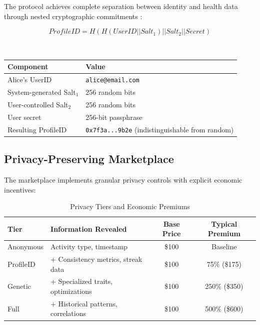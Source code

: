 \documentclass[11pt,letterpaper]{article}
\begin{document}
The protocol achieves complete separation between identity and health data through nested cryptographic commitments \cite{harshberger2025patent,groth2016size}:

\begin{equation}
ProfileID = H(H(UserID || Salt_1) || Salt_2 || Secret)
\end{equation}


~


\begin{table}[H]
\centering
\begin{tabular}{ll}
\toprule
\textbf{Component} & \textbf{Value} \\
\midrule
Alice's UserID & \texttt{alice@email.com} \\
System-generated Salt$_1$ & 256 random bits \\
User-controlled Salt$_2$ & 256 random bits \\
User secret & 256-bit passphrase \\
Resulting ProfileID & \texttt{0x7f3a...9b2e} (indistinguishable from random) \\
\bottomrule
\end{tabular}
\end{table}


\subsection{Privacy-Preserving Marketplace}

The marketplace implements granular privacy controls with explicit economic incentives:

\begin{table}[H]
\centering
\caption{Privacy Tiers and Economic Premiums}
\begin{tabular}{llcc}
\toprule
\textbf{Tier} & \textbf{Information Revealed} & \textbf{Base Price} & \textbf{Typical Premium} \\
\midrule
Anonymous & Activity type, timestamp & \$100 & Baseline \\
ProfileID & + Consistency metrics, streak data & \$100 & 75\% (\$175) \\
Genetic & + Specialized traits, optimizations & \$100 & 250\% (\$350) \\
Full & + Historical patterns, correlations & \$100 & 500\% (\$600) \\
\bottomrule
\end{tabular}
\end{table}
\end{document}
